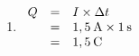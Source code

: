 {\begin{mdframed}[linewidth=4, leftmargin=40, rightmargin=40]
\begin{exercise}
\begin{enumerate}[noitemsep, label=\textbf{Step} \textbf{\arabic*}. ]
\begin{math}I=\frac{Q}{\Delta t}\end{math}\label{m38773*id1171079960509}\item 
 \label{m38773*id63232}\begin{math}\begin{array}{ccc}\hfill Q& =& I\ensuremath{\times}\Delta t\hfill \\ & =& \hfill 1,5\phantom{\rule{2pt}{0ex}}\mathrm{A}\ensuremath{\times}1\phantom{\rule{2pt}{0ex}}\mathrm{s}\\ & =& 1,5\phantom{\rule{2pt}{0ex}}\mathrm{C}\hfill \end{array}\end{math}\par \end{enumerate}
        
    \end{exercise}
    \end{mdframed}
    }
    \noindent
  

    
\par
            \label{m38773*exid003}\vspace{.5cm} 
      
